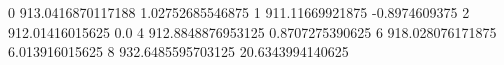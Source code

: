 0 913.0416870117188 1.02752685546875
1 911.11669921875 -0.8974609375
2 912.01416015625 0.0
4 912.8848876953125 0.8707275390625
6 918.028076171875 6.013916015625
8 932.6485595703125 20.6343994140625
